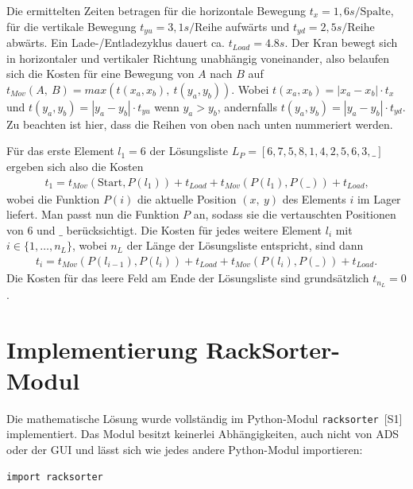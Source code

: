 \documentclass{fh-ium-bama}
\newcommand{\racksorter}{\lstinline|racksorter|}
\begin{document}
Die ermittelten Zeiten betragen für die horizontale Bewegung $t_x = 1{,}6s/\text{Spalte}$, für die vertikale Bewegung $t_{yu} = 3{,}1s/\text{Reihe}$ aufwärts und $t_{yd} = 2{,}5s/\text{Reihe}$ abwärts. Ein Lade-/Entladezyklus dauert ca.{} $t_{Load} = 4.8s$. Der Kran bewegt sich in horizontaler und vertikaler Richtung unabhängig voneinander, also belaufen sich die Kosten für eine Bewegung von $A$ nach $B$ auf
$t_{Mov}(A,~B) = max(t(x_a, x_b),~t(y_a, y_b))$. Wobei $t(x_a, x_b) = |x_a - x_b| \cdot t_x$ und $t(y_a, y_b) = |y_a - y_b| \cdot t_{yu}$ wenn $y_a > y_b$, andernfalls $t(y_a, y_b) = |y_a - y_b| \cdot t_{yd}$. Zu beachten ist hier, dass die Reihen von oben nach unten nummeriert werden.

Für das erste Element $l_1 = 6$ der Lösungsliste $L_P = [6, 7, 5, 8, 1, 4, 2, 5, 6, 3, \_]$ ergeben sich also die Kosten
\begin{gather*}
t_1 = t_{Mov}(\text{Start},P(l_1)) + t_{Load} + t_{Mov}(P(l_1),P(\_)) + t_{Load}
\text{,}
\end{gather*}
wobei die Funktion $P(i)$ die aktuelle Position $(x,~y)$ des Elements $i$ im Lager liefert. Man passt nun die Funktion $P$ an, sodass sie die vertauschten Positionen von $6$ und $\_$ berücksichtigt. Die Kosten für jedes weitere Element $l_i$ mit $i \in \{1, \dots, n_L\}$, wobei $n_L$ der Länge der Lösungsliste entspricht, sind dann
\begin{gather*}
t_i = t_{Mov}(P(l_{i-1}),P(l_i)) + t_{Load} + t_{Mov}(P(l_i),P(\_)) + t_{Load}
\text{.}
\end{gather*}
Die Kosten für das leere Feld am Ende der Lösungsliste sind grundsätzlich $t_{n_L} = 0$.

\newpage
\lstset{language=Python}
\section{Implementierung RackSorter-Modul}
Die mathematische Lösung wurde vollständig im Python-Modul \racksorter\ {[S1]} implementiert. Das Modul besitzt keinerlei Abhängigkeiten, auch nicht von ADS oder der GUI und lässt sich wie jedes andere Python-Modul importieren:
\begin{lstlisting}
import racksorter
\end{lstlisting}
\end{document}
